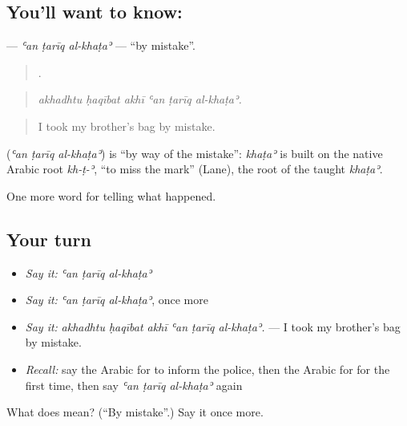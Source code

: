 \subsection*{You'll want to know:   }
\textbf{  } — \emph{ʿan ṭarīq al-khaṭaʾ} — \textquotedblleft{}by mistake\textquotedblright{}.

\begin{quote}
     .
\end{quote}

\begin{quote}
\emph{akhadhtu ḥaqībat akhī ʿan ṭarīq al-khaṭaʾ.}
\end{quote}

\begin{quote}
I took my brother’s bag by mistake.
\end{quote}

\begin{cousinweb}
\textbf{  } (\emph{ʿan ṭarīq al-khaṭaʾ}) is \textquotedblleft{}by way of the mistake\textquotedblright{}: \emph{khaṭaʾ} is built on the native Arabic root \emph{kh-ṭ-ʾ}, \textquotedblleft{}to miss the mark\textquotedblright{} (Lane), the root of the taught \emph{khaṭaʾ}.
\end{cousinweb}

\begin{grammarlens}[title={What you've built}]
One more word for telling what happened.
\end{grammarlens}

\subsection*{Your turn}
\begin{itemize}
\raggedright
  \item \emph{Say it:} \emph{ʿan ṭarīq al-khaṭaʾ}
  \item \emph{Say it:} \emph{ʿan ṭarīq al-khaṭaʾ}, once more
  \item \emph{Say it:} \emph{akhadhtu ḥaqībat akhī ʿan ṭarīq al-khaṭaʾ.} — I took my brother’s bag by mistake.
  \item \emph{Recall:} say the Arabic for to inform the police, then the Arabic for for the first time, then say \emph{ʿan ṭarīq al-khaṭaʾ} again
\end{itemize}

\begin{tcolorbox}[breakable,colback=teal!4,colframe=teal!35!black,title={Before you move on}]
What does    mean? (\textquotedblleft{}By mistake\textquotedblright{}.) Say it once more.
\end{tcolorbox}
